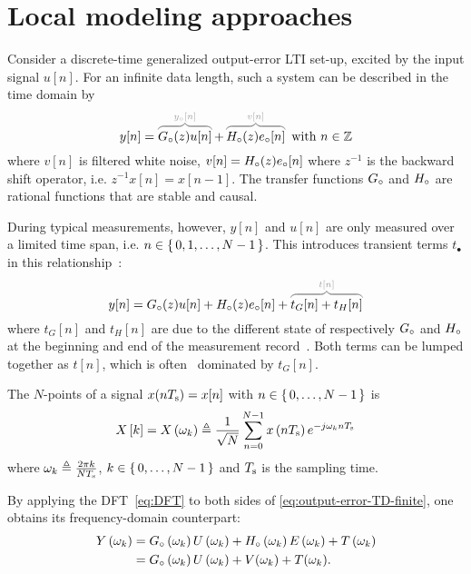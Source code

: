 \section{Local modeling approaches}
\label{sec:theory}

Consider a discrete-time generalized output-error \gls{LTI} set-up, excited by the input signal $u[n]$.
For an infinite data length, such a system can be described in the time domain by
\begin{equation}
  y[n] = \ezbrace{\true{G}(z) u[n]}{\true{y}[n]} + \ezbrace{\true{H}(z) \true{e}[n]}{v[n]} \text{ with } n \in \IntegerNumbers
  \label{eq:output-error-TD-infinite}
\end{equation}
where $v[n]$ is filtered white noise, $v[n] = {H}_{\circ}(z) {e}_{\circ}[n]$ where $z^{-1}$ is the backward shift operator, i.e. $z^ {-1}x[n] = x[n-1]$.
The transfer functions ${G}_{\circ}$ and ${H}_{\circ}$ are rational functions that are stable and causal.

During typical measurements, however, $y[n]$ and $u[n]$ are only measured over a limited time span, i.e. $n \in \set{0,1,\ldots,N-1}$.
This introduces transient terms $t_{\bullet}$ in this relationship~\citep{Pintelon1997ARB}:
\begin{equation}
y[n] = \true{G}(z) u[n] + \true{H}(z) \true{e}[n] + \ezbrace{t_G[n] + t_H[n]}{t[n]}
\label{eq:output-error-TD-finite}
\end{equation}
where $t_G[n]$ and $t_H[n]$ are due to the different state of respectively ${G}_{\circ}$ and ${H}_{\circ}$ at the beginning and end of the measurement record~\citep{Pintelon1997ARB}.
Both terms can be lumped together as $t[n]$, which is often~\citep{Pintelon2010LPM1} dominated by $t_G[n]$.

\begin{definition}\label{def:DFT}
The $N$-points  of a signal $x(nT_{\mathrm{s}}) = x[n]$ with $n \in \set{0,\ldots,N-1}$ is
\begin{equation}
  X \left[ k \right] =
  X \left( \omega_k \right)
  \triangleq
  \frac{1}{\sqrt{N}}\sum_{n=0}^{N-1} x \left( n T_{\mathrm{s}} \right)  e^{- j \omega_k n T_{\mathrm{s}} }
  \label{eq:DFT}
\end{equation}
where $\omega_k \triangleq \tfrac{2 \pi k }{N T_{\mathrm{s}}}$, $k \in \set{0,\ldots,N-1}$ and $T_{\mathrm{s}}$ is the sampling time.
\end{definition}

By applying the \gls{DFT}~\eqref{eq:DFT} to both sides of \eqref{eq:output-error-TD-finite}, one obtains its frequency-domain counterpart:
\begin{align}
    Y \left( \omega_k \right) 
    & = {G}_{\circ} \left( \omega_k \right) U \left( \omega_k \right) 
      + {H}_{\circ} \left( \omega_k \right) E \left( \omega_k \right)
      + T \left( \omega_k \right)\\
      &= {G}_{\circ} \left( \omega_k \right) U \left( \omega_k \right)  + V(\omega_k) + T(\omega_k)
      \text{.}
  \label{eq:output-error-FD}
\end{align}

